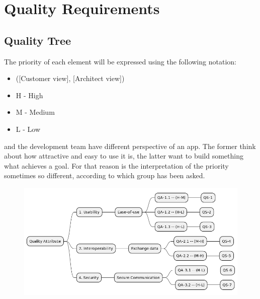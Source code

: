 \section{Quality Requirements}

\subsection{Quality Tree}

The priority of each element will be expressed using the following notation:

\begin{itemize}
    \item ([Customer view], [Architect view])
    \item H - High
    \item M - Medium
    \item L - Low
\end{itemize}

 and the development team have different perspective of an app. The former think about how attractive and easy to use
it is, the latter want to build something what achieves a goal. For that reason is the interpretation of the priority sometimes
so different, according to which group has been asked.

\begin{figure}[H]
    \centering
    \includegraphics[width=1\textwidth]{assets/quality_tree.png}
    \label{fig:quality_tree}
\end{figure}

